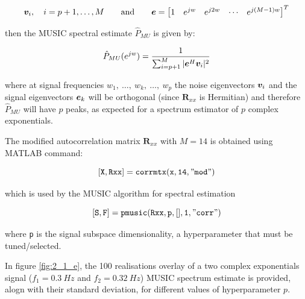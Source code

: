 \begin{enumerate}[label=\alph*), leftmargin=*]
\begin{equation}
    {\bm{v}}_{i}, \quad i = p+1, \ldots, M \qquad \text{and} \qquad
    {\bm{e}} = 
    \begin{bmatrix}
        1 & e^{jw} & e^{j2w} & \cdots &  e^{j(M-1)w}
    \end{bmatrix}^{T}
\end{equation}

then the MUSIC spectral estimate $\hat{P}_{MU}$ is given by:

\begin{equation}
    \hat{P}_{MU}(e^{jw}) = \frac{1}{\sum_{i=p+1}^{M} |{\bm{e}}^{H} {\bm{v}}_{i}|^{2}}
\end{equation}

where at signal frequencies $w_{1},\ \ldots,\ w_{k},\ \ldots,\ w_{p}$ the noise eigenvectors ${\bm{v}}_{i}$ and the signal eigenvectors ${\bm{e}}_{k}$ will be orthogonal (since $\mathbf{R}_{xx}$ is Hermitian)
and therefore $\hat{P}_{MU}$ will have $p$ peaks, as expected for a spectrum estimator of $p$ complex exponentials.

The modified autocorrelation matrix $\mathbf{R}_{xx}$ with $M = 14$ is obtained using MATLAB command:

\begin{equation*}
    \mathtt{[X,Rxx] = corrmtx(x, 14, "mod")}
\end{equation*}

which is used by the MUSIC algorithm for spectral estimation

\begin{equation*}
    \mathtt{[S,F] = pmusic(Rxx, p, [ ], 1, "corr")}
\end{equation*}

where \texttt{p} is the signal subspace dimensionality, a hyperparameter that must be tuned/selected.

In figure \ref{fig:2_1_e}, the 100 realisations overlay of a two complex exponentials signal ($f_{1} = 0.3\ Hz$ and $f_{2} = 0.32\ Hz$) MUSIC spectrum estimate is provided,
alogn with their standard deviation, for different values of hyperparameter $p$.


\end{enumerate}
